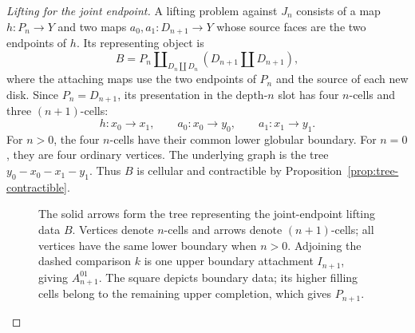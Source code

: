 \documentclass[11pt,letterpaper]{article}
\numberwithin{equation}{section}
\theoremstyle{plain}
\theoremstyle{definition}
\theoremstyle{remark}
\begin{document}
\begin{proof}[Lifting for the joint endpoint]
A lifting problem against \(J_n\) consists of a map
\(h:P_n\to Y\) and two maps \(a_0,a_1:D_{n+1}\to Y\)
whose source faces are the two endpoints of \(h\).  Its representing
object is
\begin{equation}\label{eq:partial-path-tree-domain}
 B=P_n\amalg_{D_n\amalg D_n}(D_{n+1}\amalg D_{n+1}),
\end{equation}
where the attaching maps use the two endpoints of \(P_n\) and
the source of each new disk.  Since \(P_n=D_{n+1}\), its
presentation in the depth-\(n\) slot has four \(n\)-cells and
three \((n+1)\)-cells:
\[
 h:x_0\longrightarrow x_1,\qquad
 a_0:x_0\longrightarrow y_0,\qquad
 a_1:x_1\longrightarrow y_1.
\]
For \(n>0\), the four \(n\)-cells have their common lower
globular boundary.  For \(n=0\), they are four ordinary vertices.
The underlying graph is the tree \(y_0-x_0-x_1-y_1\).
Thus \(B\) is cellular and contractible by
Proposition~\ref{prop:tree-contractible}.

\begin{figure}
\centering
{}
\caption{The solid arrows form the tree representing the joint-endpoint
lifting data \(B\).  Vertices denote \(n\)-cells and arrows denote
\((n+1)\)-cells; all vertices have the same lower boundary when \(n>0\).
Adjoining the dashed comparison \(k\) is one upper boundary attachment
\(I_{n+1}\), giving \(A_{n+1}^{01}\).  The square depicts boundary
data; its higher filling cells belong to the remaining upper completion,
which gives \(P_{n+1}\).}
\label{fig:joint-endpoints}
\end{figure}



\end{proof}
\end{document}

